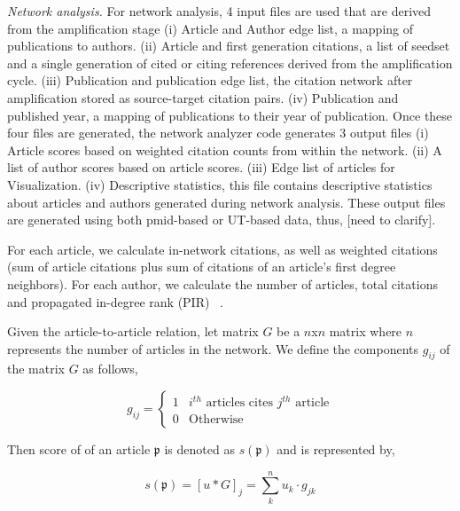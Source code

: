 \documentclass[review]{elsarticle}
\begin{document}
\emph{Network analysis.} For network  analysis, 4 input files are used that are derived from the amplification stage (i) Article and Author edge list, a mapping of publications to authors. (ii) Article and first generation citations, a list of seedset and a single generation of cited or citing references derived from the amplification cycle. (iii) Publication and publication edge list, the citation network after amplification stored as source-target citation pairs. (iv) Publication and published year, a mapping of publications to their year of publication. Once these four files are generated, the network analyzer code generates 3 output files (i) Article scores based on weighted citation counts from within the network. (ii) A list of author scores based on article scores. (iii) Edge list of articles for Visualization. (iv) Descriptive statistics, this file contains descriptive statistics about articles and authors generated during network analysis. These output files are generated using both pmid-based or UT-based data, thus, [need to clarify].

For each article, we calculate in-network citations, as well as weighted citations (sum of article citations plus sum of citations of an article's first degree neighbors). For each author, we calculate the number of articles, total citations and propagated in-degree rank (PIR) ~\cite{Williams2015}. 

Given the article-to-article relation, let matrix $G$ be a $n$x$n$ matrix where $n$ represents the number of articles in the network. We define 
the components $g_{ij}$ of the matrix $G$ as follows,

\begin{equation*}
g_{ij} = \begin{cases}
1 &\text{$i^{th}$ articles cites $j^{th}$ article}\\
0 &\text{Otherwise}
\end{cases}
\end{equation*}

Then score of of an article  $\mathfrak{p}$ is denoted as $s(\mathfrak{p})$ and is represented by,

\begin{equation*}
s(\mathfrak{p}) = [u*G]_{j} = \sum_k^n  u_k \cdot g_{jk}
\end{equation*}
\end{document}
